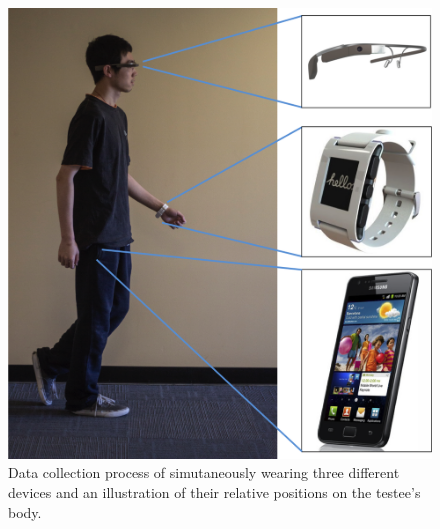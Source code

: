 \begin{figure}
  \centering
  \includegraphics[width=0.9\columnwidth]{figures/experiement_setup.png}
  \caption{Data collection process of simutaneously wearing three different devices and an illustration of their relative positions on the testee's body.}
  \label{fig:exp}
\end{figure}



